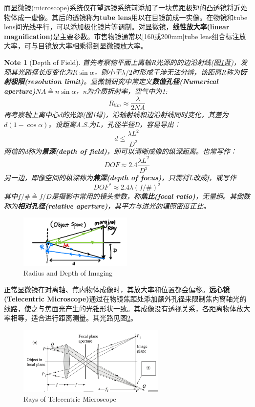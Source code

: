 \documentclass[12pt]{ctexart}%
\newtheorem{note}{Note}
\begin{document}
\par 而显微镜(microscope)系统仅在望远镜系统前添加了一块焦距极短的凸透镜将近处物体成一虚像。其后的透镜称为\textbf{tube lens}用以在目镜前成一实像。在物镜和tube lens间光线平行，可以添加极化镜片等调制。对显微镜，\textbf{线性放大率(linear magnification)}是主要参数。市售物镜通常以[160或200mm]tube lens组合标注放大率，可与目镜放大率相乘得到显微镜放大率。
\begin{note}[Depth of Field]
    首先考察物平面上离轴R光源的的边沿射线(图\ref{depth}蓝)，发现其光路径长度变化为$R\sin{\alpha}$，则小于$\lambda/2$时形成干涉无法分辨，该距离R称为\textbf{衍射极限(resolution limit)}。显微镜研究中常定义\textbf{数值孔径(Numerical aperture)}$NA\triangleq n\sin{\alpha}$，n为介质折射率，空气中为1:
    \[R_{lim}\approx\frac{\lambda}{2NA}\]
    再考察轴上离中心d的光源(图\ref{depth}绿)，沿轴射线和边沿射线同时变化，其差为$d(1-\cos{\alpha})$。设距离A.S.为L，孔径半径D，容易导出：
    \[d\leq\frac{\lambda L^2}{D^2}\]
    两倍的d称为\textbf{景深(depth of field)}，即可以清晰成像的纵深距离。也常写作：
    \[DOF\approx2.4\frac{\lambda L^2}{D^2}\]
    另一边，即像空间的纵深称为\textbf{焦深(depth of focus)}，只需将L改成f，或写作
    \[DOF^*\approx2.4\lambda(f/\#)^2\]
    其中$f/\#\triangleq f/D$是摄影中常用的镜头参数，称\textbf{焦比(focal ratio)}，无量纲。其倒数称为\textbf{相对孔径(relative aperture)}，其平方与进光的辐照密度正比。
\end{note}
\begin{figure}[t] 
    \centering
    \includegraphics[width=0.5\textwidth]{Image/2_depth.jpeg}
    \caption{Radius and Depth of Imaging}\label{depth}
\end{figure}
\par 正常显微镜在对离轴、焦内物体成像时，其放大率和位置都会偏移。\textbf{远心镜(Telecentric Microscope)}通过在物镜焦距处添加额外孔径来限制焦内离轴光的线路，使之与焦面光产生的光锥形状一致。其成像没有透视关系，各距离物体放大率相等，适合进行距离测量。其光路见图\ref{tele}。
\begin{figure}[b] %
    \centering
    \includegraphics[width=0.65\textwidth]{Image/2_tele.png}
    \caption{Rays of Telecentric Microscope}
    \label{tele}
\end{figure}
\end{document}

